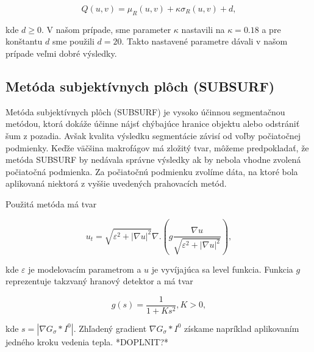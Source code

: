 \documentclass[a4paper,11pt,twoside]{article}%
\def\epsilon{\varepsilon}
\begin{document}
\begin{equation}
Q(u,v) = \mu_R(u,v) + \kappa\sigma_R(u,v) + d,
\end{equation}

kde $d \geq 0$. V našom prípade, sme parameter $\kappa$ nastavili na $\kappa = 0.18$ a pre konštantu $d$ sme použili $d = 20$. Takto nastavené parametre dávali v našom prípade veľmi dobré výsledky.



\subsection{Metóda subjektívnych plôch (SUBSURF)} 

Metóda subjektívnych plôch (SUBSURF) je vysoko účinnou segmentačnou metódou, ktorá dokáže účinne nájsť chýbajúce hranice objektu alebo odstrániť šum z pozadia. Avšak kvalita výsledku segmentácie závisí od voľby počiatočnej podmienky. Keďže väčšina makrofágov má zložitý tvar, môžeme predpokladať, že metóda SUBSURF by nedávala správne výsledky ak by nebola vhodne zvolená počiatočná podmienka. Za počiatočnú podmienku zvolíme dáta, na ktoré bola aplikovaná niektorá z vyššie uvedených prahovacích metód.

Použitá metóda má tvar

\begin{equation} \label{eq:subsurf}
u_t = \sqrt{\epsilon^2 + |\nabla u|^2}\nabla.(g \frac{\nabla u}{\sqrt{\epsilon^2 + |\nabla u|^2}}),
\end{equation}

kde $\epsilon$ je modelovacím parametrom a $u$ je vyvíjajúca sa level funkcia. Funkcia $g$ reprezentuje takzvaný hranový detektor a má tvar

\begin{equation}
g(s) = \frac{1}{1+Ks^2}, K > 0,
\end{equation}

kde $s = |\nabla G_\sigma*I^0|$. Zhľadený gradient $\nabla G_\sigma*I^0$ získame napríklad aplikovaním jedného kroku vedenia tepla. *DOPLNIT?*


\end{document}
